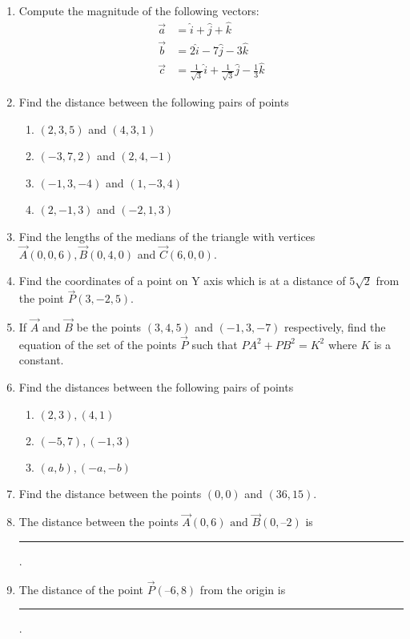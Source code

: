\begin{enumerate}[label=\thesubsection.\arabic*, ref=\thesubsection.\theenumi]
\item Compute the magnitude of the following vectors:
\begin{align}
	\vec{a}&=\hat{i}+\hat{j}+\hat{k}
	\\
	\vec{b}&=2\hat{i}-7\hat{j}-3\hat{k}
	\\
	\vec{c}&=\frac{1}{\sqrt{3}}\hat{i}+\frac{1}{\sqrt{3}}\hat{j}-\frac{1}{3}\hat{k}
\end{align}
    \solution 
		
\item Find the distance between the following pairs of points
\begin{enumerate}[label=(\roman*)]
\item $(2, 3, 5)$ and $(4, 3, 1)$
\item $(-3, 7, 2)$ and $(2, 4, -1)$
\item $(-1, 3, -4)$ and $(1, -3, 4)$
\item $(2, -1, 3)$ and $(-2, 1, 3)$
\end{enumerate}
\item Find the lengths of the medians of the triangle with vertices $\vec{A}(0, 0, 6),  \vec{B}(0, 4, 0)$ and $\vec{C}(6, 0, 0)$.
\item Find the coordinates of a point on Y axis which is at a distance of $5\sqrt2$ from the point $\vec{P}(3, -2, 5)$.
\item If $\vec{A}$ and $\vec{B}$ be the points $(3, 4, 5)$ and $(-1, 3, -7)$ respectively,  find the equation of the set of the points $\vec{P}$ such that $PA^2+PB^2=K^2$ where $K$ is a constant.
\item Find the distances between the following pairs of points
\begin{enumerate}
\item $(2, 3), (4, 1)$
\item $(-5, 7), (-1, 3)$
\item $(a, b), (-a, -b)$
\end{enumerate}
\solution
		
\item Find the distance between the points $(0, 0)$ and $ (36, 15)$.
	\\
		\solution
		
\item The distance between the points $\vec{A}(0,  6) \text{ and } \vec{B}(0,  –2)$ is \rule{1cm}{0.1pt}.
\item The distance of the point $\vec{P} (–6,  8)$ from the origin is \rule{1cm}{0.1pt}.

\end{enumerate}
